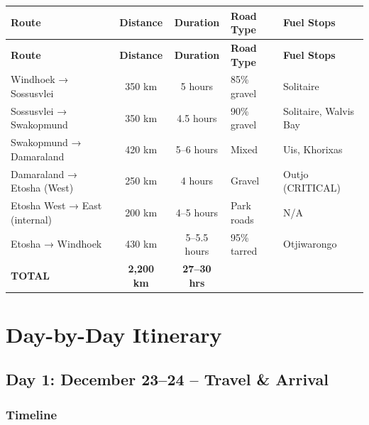\documentclass[11pt]{article}
\begin{document}
\begin{longtable}{lccll}
\toprule
\textbf{Route} & \textbf{Distance} & \textbf{Duration} & \textbf{Road Type} & \textbf{Fuel Stops} \\
\midrule
\endfirsthead
\toprule
\textbf{Route} & \textbf{Distance} & \textbf{Duration} & \textbf{Road Type} & \textbf{Fuel Stops} \\
\midrule
\endhead
Windhoek → Sossusvlei & 350 km & 5 hours & 85\% gravel & Solitaire \\
Sossusvlei → Swakopmund & 350 km & 4.5 hours & 90\% gravel & Solitaire, Walvis Bay \\
Swakopmund → Damaraland & 420 km & 5--6 hours & Mixed & Uis, Khorixas \\
Damaraland → Etosha (West) & 250 km & 4 hours & Gravel & Outjo (CRITICAL) \\
Etosha West → East (internal) & 200 km & 4--5 hours & Park roads & N/A \\
Etosha → Windhoek & 430 km & 5--5.5 hours & 95\% tarred & Otjiwarongo \\
\midrule
\textbf{TOTAL} & \textbf{2,200 km} & \textbf{27--30 hrs} & & \\
\bottomrule
\end{longtable}

\clearpage
\section{Day-by-Day Itinerary}

\subsection{Day 1: December 23--24 -- Travel \& Arrival}

\subsubsection{Timeline}
\end{document}
